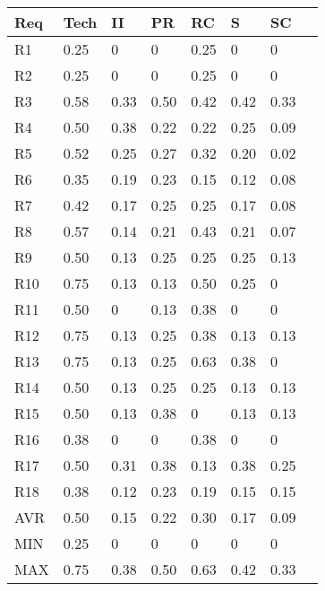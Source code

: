 \begin{tabularx}{\columnwidth}{|l|X|X|X|X|X|X|X|}
\hline
Req	& Tech & II   & PR   & RC   & S    & SC	   \\\hline
R1	& 0.25 & 0    & 0    & 0.25 & 0    & 0	   \\\hline
R2	& 0.25 & 0    & 0    & 0.25 & 0    & 0	   \\\hline
R3	& 0.58 & 0.33 & 0.50 & 0.42 & 0.42 & 0.33	\\\hline
R4	& 0.50 & 0.38 & 0.22 & 0.22 & 0.25 & 0.09	\\\hline
R5	& 0.52 & 0.25 & 0.27 & 0.32 & 0.20 & 0.02	\\\hline
R6	& 0.35 & 0.19 & 0.23 & 0.15 & 0.12 & 0.08	\\\hline
R7	& 0.42 & 0.17 & 0.25 & 0.25 & 0.17 & 0.08	\\\hline
R8	& 0.57 & 0.14 & 0.21 & 0.43 & 0.21 & 0.07	\\\hline
R9	& 0.50 & 0.13 & 0.25 & 0.25 & 0.25 & 0.13	\\\hline
R10	& 0.75 & 0.13 & 0.13 & 0.50 & 0.25 & 0   	\\\hline
R11	& 0.50 & 0    & 0.13 & 0.38 & 0    & 0  	\\\hline
R12	& 0.75 & 0.13 & 0.25 & 0.38 & 0.13 & 0.13	\\\hline
R13	& 0.75 & 0.13 & 0.25 & 0.63 & 0.38 & 0  	\\\hline
R14	& 0.50 & 0.13 & 0.25 & 0.25 & 0.13 & 0.13	\\\hline
R15	& 0.50 & 0.13 & 0.38 & 0    & 0.13 & 0.13	\\\hline
R16	& 0.38 & 0    & 0    & 0.38 & 0    & 0  	\\\hline
R17	& 0.50 & 0.31 & 0.38 & 0.13 & 0.38 & 0.25	\\\hline
R18	& 0.38 & 0.12 & 0.23 & 0.19 & 0.15 & 0.15	\\\hline
AVR	& 0.50 & 0.15 & 0.22 & 0.30 & 0.17 & 0.09  \\\hline
MIN	& 0.25 & 0    & 0    & 0    & 0    & 0     \\\hline
MAX	& 0.75 & 0.38 & 0.50 & 0.63 & 0.42 & 0.33  \\\hline
\end{tabularx}